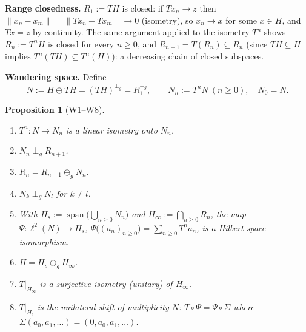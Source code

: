 \documentclass[11pt,a4paper]{article}
\newtheorem{proposition}[theorem]{Proposition}
\theoremstyle{definition}
\theoremstyle{remark}
\newcommand{\pg}{\perp_g}
\begin{document}
\textbf{Range closedness.} $R_1:=TH$ is closed: if $Tx_n\to z$ then
$\|x_n-x_m\|=\|Tx_n-Tx_m\|\to0$ (isometry), so $x_n\to x$ for some $x\in H$, and $Tx=z$ by
continuity. The same argument applied to the isometry $T^{n}$ shows $R_n:=T^{n}H$ is closed
for every $n\ge0$, and $R_{n+1}=T(R_n)\subseteq R_n$ (since $TH\subseteq H$ implies
$T^n(TH)\subseteq T^n(H)$): a decreasing chain of closed subspaces.

\textbf{Wandering space.} Define
\[
N:=H\ominus TH=(TH)^{\pg}=R_1^{\pg},\qquad N_n:=T^{n}N\ (n\ge0),\quad N_0=N.
\]

\begin{proposition}[W1--W8]
\label{prop:wold}
\begin{enumerate}[label=(W\arabic*)]
\item $T^{n}:N\to N_n$ is a linear isometry onto $N_n$.
\item $N_n\perp_g R_{n+1}$.
\item $R_n=R_{n+1}\oplus_g N_n$.
\item $N_k\perp_g N_l$ for $k\ne l$.
\item With $H_s:=\overline{\operatorname{span}}\big(\bigcup_{n\ge0}N_n\big)$ and
$H_\infty:=\bigcap_{n\ge0}R_n$, the map $\Psi:\ell^2(N)\to H_s$,
$\Psi\big((a_n)_{n\ge0}\big)=\sum_{n\ge0}T^na_n$, is a Hilbert-space isomorphism.
\item $H=H_s\oplus_g H_\infty$.
\item $T|_{H_\infty}$ is a surjective isometry (unitary) of $H_\infty$.
\item $T|_{H_s}$ is the unilateral shift of multiplicity $N$: $T\circ\Psi=\Psi\circ\Sigma$
where $\Sigma(a_0,a_1,\dots)=(0,a_0,a_1,\dots)$.
\end{enumerate}
\end{proposition}
\end{document}
